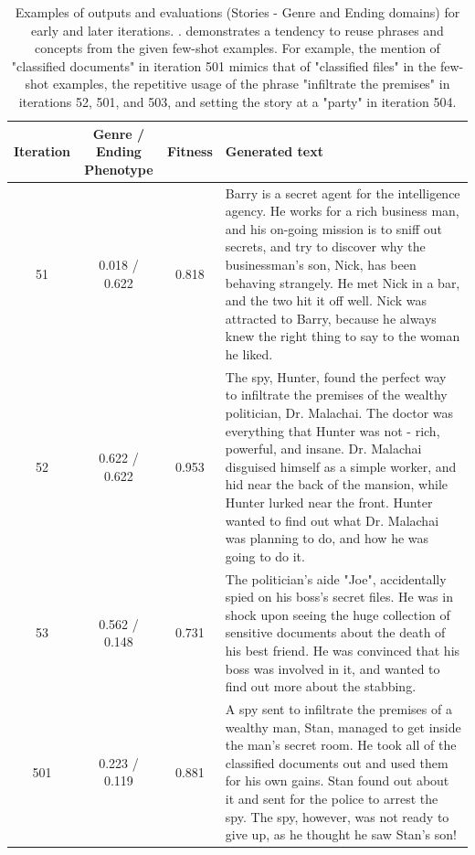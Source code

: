 \begin{table}[ht]
  \caption{Examples of outputs and evaluations (Stories - Genre and Ending domains) for early and later iterations. \basetwo. \basetwo{} demonstrates a tendency to reuse phrases and concepts from the given few-shot examples. For example, the mention of "classified documents" in iteration 501 mimics that of "classified files" in the few-shot examples, the repetitive usage of the phrase "infiltrate the premises" in iterations 52, 501, and 503, and setting the story at a "party" in iteration 504.}
  \label{tab:b2-qualitative-story}
  \begin{center}
  \small
  \begin{tabular}{cccp{8.5cm}}
    \toprule
    Iteration & \makecell[t]{Genre / Ending \\ Phenotype} & Fitness & Generated text \\
    \midrule
    51 &  0.018 / 0.622 & 0.818 & Barry is a secret agent for the intelligence agency. He works for a rich business man, and his on-going mission is to sniff out secrets, and try to discover why the businessman's son, Nick, has been behaving strangely. He met Nick in a bar, and the two hit it off well. Nick was attracted to Barry, because he always knew the right thing to say to the woman he liked. \\
    \midrule
    52 & 0.622 / 0.622 & 0.953 & The spy, Hunter, found the perfect way to infiltrate the premises of the wealthy politician, Dr. Malachai. The doctor was everything that Hunter was not - rich, powerful, and insane. Dr. Malachai disguised himself as a simple worker, and hid near the back of the mansion, while Hunter lurked near the front. Hunter wanted to find out what Dr. Malachai was planning to do, and how he was going to do it. \\
    \midrule
    53 & 0.562 / 0.148 & 0.731 & The politician's aide "Joe", accidentally spied on his boss's secret files. He was in shock upon seeing the huge collection of sensitive documents about the death of his best friend. He was convinced that his boss was involved in it, and wanted to find out more about the stabbing. \\
    \midrule
    \midrule
    501 &  0.223 / 0.119 & 0.881 & A spy sent to infiltrate the premises of a wealthy man, Stan, managed to get inside the man's secret room. He took all of the classified documents out and used them for his own gains. Stan found out about it and sent for the police to arrest the spy. The spy, however, was not ready to give up, as he thought he saw Stan's son! \\

\end{tabular}
\end{center}
\end{table}
